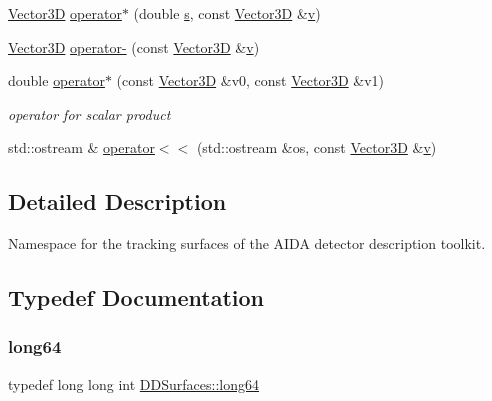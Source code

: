 \begin{DoxyCompactItemize}
\item 
\hyperlink{class_d_d_surfaces_1_1_vector3_d}{Vector3D} \hyperlink{namespace_d_d_surfaces_a6bbc0c2ca88c4b8e2fdcaf98199f4cd8}{operator$\ast$} (double \hyperlink{_volumes_8cpp_a17ca6bfc8040d695d3cada22a4763d40}{s}, const \hyperlink{class_d_d_surfaces_1_1_vector3_d}{Vector3D} \&\hyperlink{_multi_view_8cpp_a8320ee13ac034dbf6d624fe8953dd337}{v})
\item 
\hyperlink{class_d_d_surfaces_1_1_vector3_d}{Vector3D} \hyperlink{namespace_d_d_surfaces_a34c1378c2915634e7266335c283ad07d}{operator-\/} (const \hyperlink{class_d_d_surfaces_1_1_vector3_d}{Vector3D} \&\hyperlink{_multi_view_8cpp_a8320ee13ac034dbf6d624fe8953dd337}{v})
\item 
double \hyperlink{namespace_d_d_surfaces_ac26468a9e0a55f857dd466023fd49e53}{operator$\ast$} (const \hyperlink{class_d_d_surfaces_1_1_vector3_d}{Vector3D} \&v0, const \hyperlink{class_d_d_surfaces_1_1_vector3_d}{Vector3D} \&v1)
\begin{DoxyCompactList}\small\item\em operator for scalar product \end{DoxyCompactList}\item 
std\+::ostream \& \hyperlink{namespace_d_d_surfaces_a7253b384ad158db02712cc561182ce19}{operator$<$$<$} (std\+::ostream \&os, const \hyperlink{class_d_d_surfaces_1_1_vector3_d}{Vector3D} \&\hyperlink{_multi_view_8cpp_a8320ee13ac034dbf6d624fe8953dd337}{v})
\end{DoxyCompactItemize}


\subsection{Detailed Description}
Namespace for the tracking surfaces of the A\+I\+DA detector description toolkit. 

\subsection{Typedef Documentation}
\hypertarget{namespace_d_d_surfaces_ab6b3da366f31f80aec56447ac4442e78}{}\label{namespace_d_d_surfaces_ab6b3da366f31f80aec56447ac4442e78} 
\subsubsection{\texorpdfstring{long64}{long64}}
{\footnotesize\ttfamily typedef long long int \hyperlink{namespace_d_d_surfaces_ab6b3da366f31f80aec56447ac4442e78}{D\+D\+Surfaces\+::long64}}



